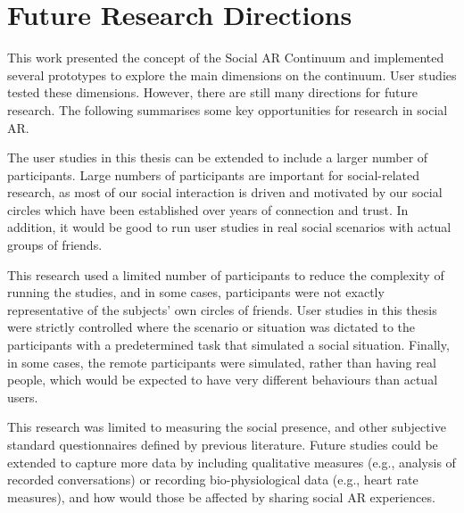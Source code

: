 

\section{Future Research Directions}

This work presented the concept of the Social AR Continuum and implemented several prototypes to explore the main dimensions on the continuum. User studies tested these dimensions. However, there are still many directions for future research. The following summarises some key opportunities for research in social AR.

The user studies in this thesis can be extended to include a larger number of participants. Large numbers of participants are important for social-related research, as most of our social interaction is driven and motivated by our social circles which have been established over years of connection and trust.  In addition, it would be good to run user studies in real social scenarios with actual groups of friends.

This research used a limited number of participants to reduce the complexity of running the studies, and in some cases, participants were not exactly representative of the subjects' own circles of friends. User studies in this thesis were strictly controlled where the scenario or situation was dictated to the participants with a predetermined task that simulated a social situation. Finally, in some cases, the remote participants were simulated, rather than having real people, which would be expected to have very different behaviours than actual users.

This research was limited to measuring the social presence, and other subjective standard questionnaires defined by previous literature. Future studies could be extended to capture more data by including qualitative measures (e.g., analysis of recorded conversations) or recording bio-physiological data (e.g., heart rate measures), and how would those be affected by sharing social AR experiences.

